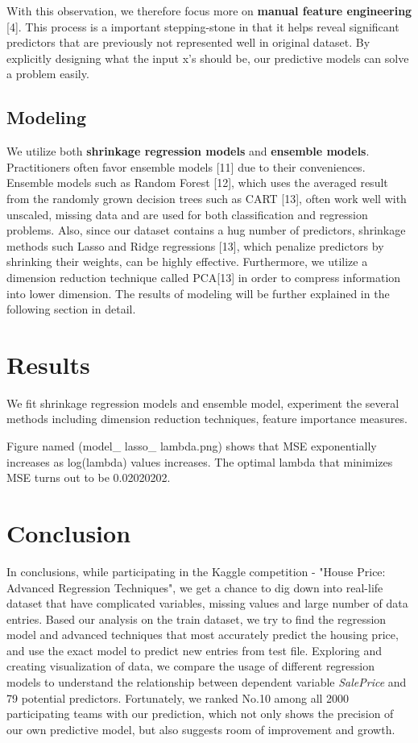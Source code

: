 \documentclass[a4paper]{article}
\begin{document}
\begin{flushleft}
With this observation, we therefore focus more on \textbf{manual feature engineering} [4]. This process is a important stepping-stone in that it helps reveal significant predictors that are previously not represented well in original dataset. By explicitly designing what the input x's should be, our predictive models can solve a problem easily. \newline


\subsection{Modeling}
We utilize both \textbf{shrinkage regression models} and \textbf{ensemble models}. Practitioners often favor ensemble models [11] due to their conveniences. Ensemble models such as Random Forest [12], which uses the averaged result from the randomly grown decision trees such as CART [13], often work well with unscaled, missing data and are used for both classification and regression problems. Also, since our dataset contains a hug number of predictors, shrinkage methods such Lasso and Ridge regressions [13], which penalize predictors by shrinking their weights, can be highly effective. Furthermore, we utilize a dimension reduction technique called PCA[13] in order to compress information into lower dimension. The results of modeling will be further explained in the following section in detail.


\section{Results}

We fit shrinkage regression models and ensemble model, experiment the several methods including dimension reduction techniques, feature importance measures. \newline

Figure named (model\_ lasso\_ lambda.png) shows that MSE exponentially increases as log(lambda) values increases. The optimal lambda that minimizes MSE turns out to be 0.02020202. 


\section{Conclusion}

In conclusions, while participating in the Kaggle competition - "House Price: Advanced Regression Techniques", we get a chance to dig down into real-life dataset that have complicated variables, missing values and large number of data entries. Based our analysis on the train dataset, we try to find the regression model and advanced techniques that most accurately predict the housing price, and use the exact model to predict new entries from test file. Exploring and creating visualization of data, we compare the usage of different regression models to understand the relationship between dependent variable \textit{SalePrice} and 79 potential predictors. Fortunately, we ranked No.10 among all 2000 participating teams with our prediction, which not only shows the precision of our own predictive model, but also suggests room of improvement and growth. \newline


\end{flushleft}
\end{document}
